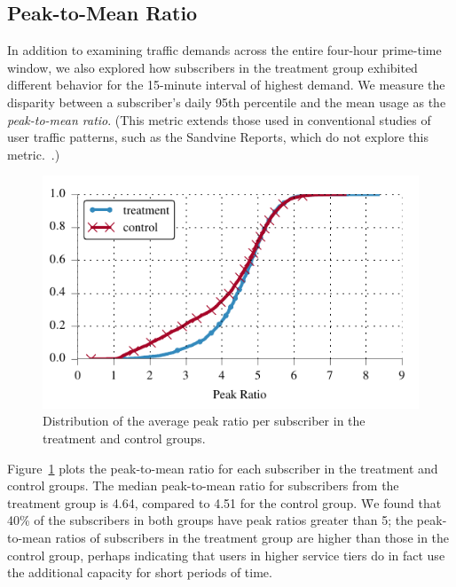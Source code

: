 \subsection{Peak-to-Mean Ratio}\label{subsec:peakratio}

In addition to examining traffic demands across the entire four-hour
prime-time window, we also explored how subscribers in the treatment
group exhibited different behavior for the 15-minute interval of highest
demand. We measure the disparity between a subscriber's daily 95th percentile and 
the mean usage as the \emph{peak-to-mean ratio}. (This metric extends those used
in conventional studies of user traffic patterns, such as the Sandvine
Reports, which do not explore this metric.~\cite{sandvine20141h}.) 

\begin{figure}[t]
\begin{minipage}{1\linewidth}
\centering
\includegraphics[width=1\linewidth]{figures/peakratio_cdf_mean-devices.pdf}
\caption{Distribution of the average peak ratio per subscriber in the treatment and 
control groups.}
\label{fig:CDF-peak-ratio-mean}
\end{minipage}
\end{figure}

Figure~\ref{fig:CDF-peak-ratio-mean} plots the peak-to-mean ratio for each 
subscriber in the treatment and control groups. The median peak-to-mean
ratio for subscribers from the treatment group is 4.64, compared to 4.51
for the control group.
\f{We found that 40\% of the subscribers in both groups have peak ratios
greater than 5; the peak-to-mean ratios 
of subscribers in the treatment group are higher than those in the
control group, perhaps indicating that users in higher service tiers do
in fact use the additional capacity for short periods of time.}

